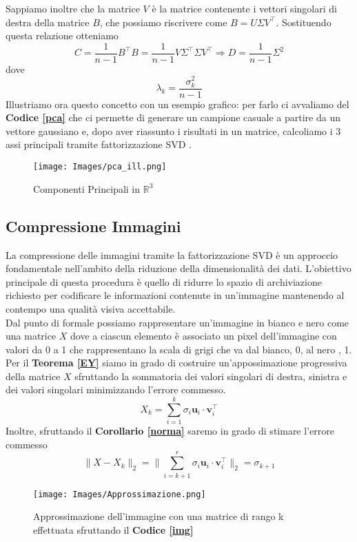 \documentclass[11pt]{article}
\newcommand{\R}{\mathbb{R}}
\begin{document}
Sappiamo inoltre che la matrice $V$ è la matrice contenente i vettori singolari di destra della matrice $B$, che possiamo riscrivere come $B = U\Sigma V^\top$. Sostituendo questa relazione otteniamo
$$
C = \frac{1}{n-1} B^\top B = \frac{1}{n-1} V \Sigma^\top \Sigma V^\top \Rightarrow D = \frac{1}{n-1} \Sigma^2
$$
dove $$
\lambda_k = \frac{\sigma_k^2}{n-1}
$$ 
Illustriamo ora questo concetto con un esempio grafico: per farlo ci avvaliamo del \textbf{Codice \ref{pca}} che ci permette di generare un campione casuale a partire da un vettore gaussiano e, dopo aver riassunto i risultati in un matrice, calcoliamo i 3 assi principali tramite fattorizzazione SVD . 
\begin{figure}[H]
    \centering
    \texttt{[image: Images/pca\_ill.png]}
    \caption{Componenti Principali in $\R^3$ }
    \label{fig:pca_ill}
\end{figure}
    
\subsection{Compressione Immagini}
La compressione delle immagini tramite la fattorizzazione SVD è un approccio fondamentale nell'ambito della riduzione della dimensionalità dei dati. L'obiettivo principale di questa procedura è quello di ridurre lo spazio di archiviazione richiesto per codificare le informazioni contenute in un'immagine mantenendo al contempo una qualità visiva accettabile.\\
Dal punto di formale possiamo rappresentare un'immagine in bianco e nero come una matrice $X$ dove a ciascun elemento è associato un pixel dell'immagine con valori da 0 a 1 che rappresentano la scala di grigi che va dal bianco, 0, al nero , 1. \\
Per il \textbf{Teorema \ref{EY}} siamo in grado di costruire un'appossimazione progressiva della matrice $X$ sfruttando la sommatoria dei valori singolari di destra, sinistra e dei valori singolari minimizzando l'errore commesso. 
$$ X_k= \sum_{i=1}^{k} \sigma_i \mathbf{u}_i \cdot \mathbf{v}_i^\top $$
Inoltre, sfruttando il \textbf{Corollario \ref{norma}} saremo in grado di stimare l'errore commesso
$$\|X-X_k\|_2 = \| \sum_{i=k+1}^{r} \sigma_i \mathbf{u}_i \cdot \mathbf{v}_i^\top\|_2=\sigma_{k+1} $$
\begin{figure}[H]
	\centering
    \texttt{[image: Images/Approssimazione.png]}
    \caption{Approssimazione dell'immagine con una matrice di rango k effettuata sfruttando il \textbf{Codice \ref{img}}}
    \label{fig:approx}
\end{figure}
\newpage
\end{document}
